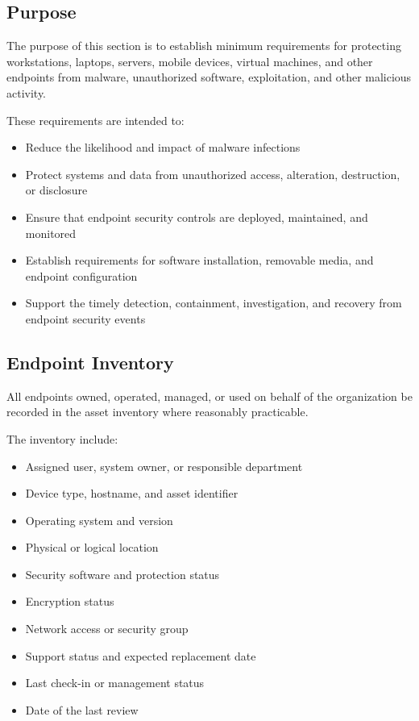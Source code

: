 \subsection{Purpose}

The purpose of this section is to establish minimum requirements for protecting workstations, laptops, servers, mobile devices, virtual machines, and other endpoints from malware, unauthorized software, exploitation, and other malicious activity.

These requirements are intended to:
\begin{itemize}
    \item Reduce the likelihood and impact of malware infections
    \item Protect systems and data from unauthorized access, alteration, destruction, or disclosure
    \item Ensure that endpoint security controls are deployed, maintained, and monitored
    \item Establish requirements for software installation, removable media, and endpoint configuration
    \item Support the timely detection, containment, investigation, and recovery from endpoint security events
\end{itemize}

\subsection{Endpoint Inventory}

All endpoints owned, operated, managed, or used on behalf of the organization \must{} be recorded in the asset inventory where reasonably practicable.

The inventory \should{} include:
\begin{itemize}
    \item Assigned user, system owner, or responsible department
    \item Device type, hostname, and asset identifier
    \item Operating system and version
    \item Physical or logical location
    \item Security software and protection status
    \item Encryption status
    \item Network access or security group
    \item Support status and expected replacement date
    \item Last check-in or management status
    \item Date of the last review
\end{itemize}

